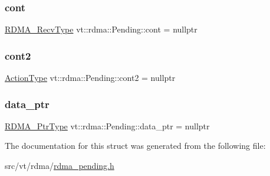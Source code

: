 \subsubsection{\texorpdfstring{cont}{cont}}
{\footnotesize\ttfamily \hyperlink{namespacevt_1_1rdma_a36020f2b7ae371b6ddc8ec9caffb72d2}{R\+D\+M\+A\+\_\+\+Recv\+Type} vt\+::rdma\+::\+Pending\+::cont = nullptr}

\mbox{\label{structvt_1_1rdma_1_1_pending_a55d01ceada3293160e3167eb7194b9bd}} 
\subsubsection{\texorpdfstring{cont2}{cont2}}
{\footnotesize\ttfamily \hyperlink{namespacevt_ae0a5a7b18cc99d7b732cb4d44f46b0f3}{Action\+Type} vt\+::rdma\+::\+Pending\+::cont2 = nullptr}

\mbox{\label{structvt_1_1rdma_1_1_pending_afcbb4951a3cfaa8981063487c0b90548}} 
\subsubsection{\texorpdfstring{data\+\_\+ptr}{data\_ptr}}
{\footnotesize\ttfamily \hyperlink{namespacevt_aab05b4a584f7ee835a6d0f66915cf59b}{R\+D\+M\+A\+\_\+\+Ptr\+Type} vt\+::rdma\+::\+Pending\+::data\+\_\+ptr = nullptr}



The documentation for this struct was generated from the following file\+:\begin{DoxyCompactItemize}
\item 
src/vt/rdma/\hyperlink{rdma__pending_8h}{rdma\+\_\+pending.\+h}\end{DoxyCompactItemize}
